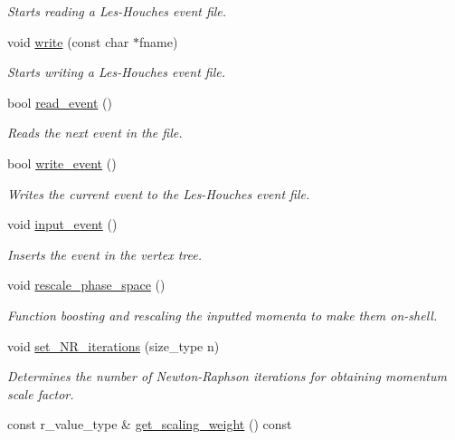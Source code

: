 \begin{DoxyCompactItemize}
\begin{DoxyCompactList}\small\item\em Starts reading a Les-\/\-Houches event file. \end{DoxyCompactList}\item 
\hypertarget{a00322_aabf04004e59b40bbc1df35d85dc177f4}{void \hyperlink{a00322_aabf04004e59b40bbc1df35d85dc177f4}{write} (const char $\ast$fname)}\label{a00322_aabf04004e59b40bbc1df35d85dc177f4}

\begin{DoxyCompactList}\small\item\em Starts writing a Les-\/\-Houches event file. \end{DoxyCompactList}\item 
bool \hyperlink{a00322_a5ab609c33cbbf9095f67903f84a6af96}{read\-\_\-event} ()
\begin{DoxyCompactList}\small\item\em Reads the next event in the file. \end{DoxyCompactList}\item 
bool \hyperlink{a00322_afa0fa10eaaae4381a48909c00cbdb767}{write\-\_\-event} ()
\begin{DoxyCompactList}\small\item\em Writes the current event to the Les-\/\-Houches event file. \end{DoxyCompactList}\item 
void \hyperlink{a00322_a96712f08c069ed72d2de8364fb740dee}{input\-\_\-event} ()
\begin{DoxyCompactList}\small\item\em Inserts the event in the vertex tree. \end{DoxyCompactList}\item 
void \hyperlink{a00322_a736d8187bd61e9136a65c6907ec0dfd1}{rescale\-\_\-phase\-\_\-space} ()
\begin{DoxyCompactList}\small\item\em Function boosting and rescaling the inputted momenta to make them on-\/shell. \end{DoxyCompactList}\item 
\hypertarget{a00322_a628289bd16fc63e510edea398ea97774}{void \hyperlink{a00322_a628289bd16fc63e510edea398ea97774}{set\-\_\-\-N\-R\-\_\-iterations} (size\-\_\-type n)}\label{a00322_a628289bd16fc63e510edea398ea97774}

\begin{DoxyCompactList}\small\item\em Determines the number of Newton-\/\-Raphson iterations for obtaining momentum scale factor. \end{DoxyCompactList}\item 
\hypertarget{a00322_a02877f2ccb7860e06d2caa77afec4015}{const r\-\_\-value\-\_\-type \& \hyperlink{a00322_a02877f2ccb7860e06d2caa77afec4015}{get\-\_\-scaling\-\_\-weight} () const }\label{a00322_a02877f2ccb7860e06d2caa77afec4015}


\end{DoxyCompactItemize}
